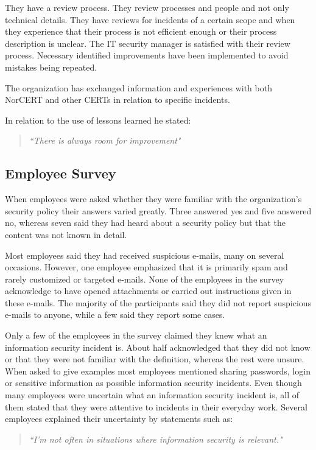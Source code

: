 They have a review process. They review processes and people and not only technical details. They have reviews for incidents of a certain scope and when they experience that their process is not efficient enough or their process description is unclear. The IT security manager is satisfied with their review process. Necessary identified improvements have been implemented to avoid mistakes being repeated.

The organization has exchanged information and experiences with both \acs{NorCERT} and other \acp{CERT} in relation to specific incidents.

In relation to the use of lessons learned he stated: 

\begin{quote}
\textit{``There is always room for improvement"}
\end{quote}

\subsection{Employee Survey}
When employees were asked whether they were familiar with the organization's security policy their answers varied greatly. Three answered yes and five answered no, whereas seven said they had heard about a security policy but that the content was not known in detail. 

Most employees said they had received suspicious e-mails, many on several occasions. However, one employee emphasized that it is primarily spam and rarely customized or targeted e-mails. None of the employees in the survey acknowledge to have opened attachments or carried out instructions given in these e-mails. The majority of the participants said they did not report suspicious e-mails to anyone, while a few said they report some cases.

Only a few of the employees in the survey claimed they knew what an information security incident is. About half acknowledged that they did not know or that they were not familiar with the definition, whereas the rest were unsure. When asked to give examples most employees mentioned sharing passwords, login or sensitive information as possible information security incidents. Even though many employees were uncertain what an information security incident is, all of them stated that they were attentive to incidents in their everyday work. 
Several employees explained their uncertainty by statements such as:
\begin{quote}
\textit{``I'm not often in situations where information security is relevant."}
\end{quote}

